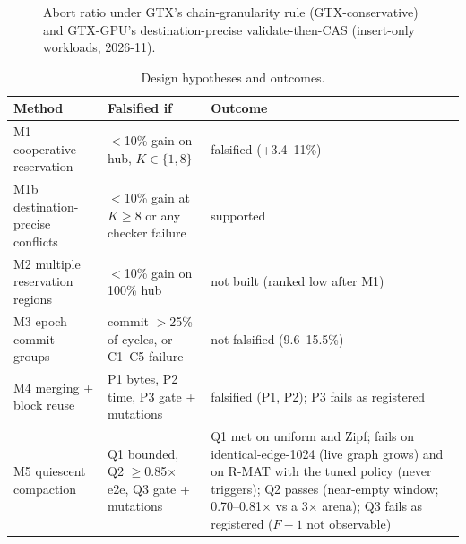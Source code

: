 \documentclass[sigconf,nonacm]{acmart}
\newcommand{\sys}{GTX-GPU}
\begin{document}
\begin{figure}[t]
\centering
{}
\caption{Abort ratio under GTX's chain-granularity rule (GTX-conservative) and \sys{}'s destination-precise
validate-then-CAS (insert-only workloads, 2026-11).}
\label{fig:aborts}
\end{figure}

\begin{table}[t]
\caption{Design hypotheses and outcomes.}
\label{tab:hyp}
\footnotesize
\setlength{\tabcolsep}{2.5pt}
\begin{tabular}{@{}P{2.3cm}P{3.2cm}P{2.0cm}@{}}
\toprule
Method & Falsified if & Outcome \\
\midrule
M1 cooperative reservation & $<$10\% gain on hub, $K\in\{1,8\}$ & falsified (+3.4--11\%) \\
M1b destination-precise conflicts & $<$10\% gain at $K\ge 8$ or any checker failure & supported \\
M2 multiple reservation regions & $<$10\% gain on 100\% hub & not built (ranked low after M1) \\
M3 epoch commit groups & commit $>$25\% of cycles, or C1--C5 failure & not falsified (9.6--15.5\%) \\
M4 merging + block reuse & P1 bytes, P2 time, P3 gate + mutations & falsified (P1, P2); P3 fails as registered \\
M5 quiescent compaction & Q1 bounded, Q2 $\ge$0.85$\times$ e2e, Q3 gate + mutations & Q1 met on uniform and Zipf; fails on identical-edge-1024 (live graph grows) and on R-MAT with the tuned policy (never triggers); Q2 passes (near-empty window; 0.70--0.81$\times$ vs a 3$\times$ arena); Q3 fails as registered ($F{-}1$ not observable) \\
\bottomrule
\end{tabular}
\end{table}
\end{document}
